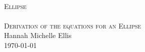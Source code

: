 \begin{titlepage}
\begin{center}
\HRule \\[0.5cm]
\textsc{\huge Ellipse}\\[0.5cm]
\HRule \\[0.5cm]
\textsc{\Large Derivation of the equations for an Ellipse}\\[0.5cm]
\vfill
Hannah Michelle Ellis\\[1.0cm]
\today
\end{center}
\end{titlepage}
